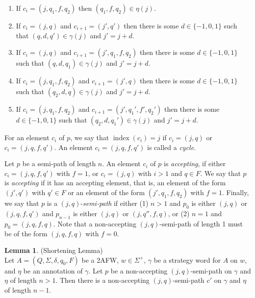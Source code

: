 \documentclass{lmcs}
\theoremstyle{definition}
\newtheorem{lemma}[thm]{Lemma}
\DeclareMathOperator{\?}{?}
\DeclareMathOperator{\myindex}{index}
\begin{document}
\begin{enumerate}
    \item If $c_i = (j,q_1,f,q_2)$ then $(q_1,f,q_2) \in \eta(j)$.


    \item If $c_i = (j,q)$ and $c_{i+1} = (j',q')$ then there is some $d \in \{-1,0,1\}$ such that $(q,d,q') \in \gamma(j)$ and $j' = j + d$.


    \item If $c_i = (j,q)$ and $c_{i+1} = (j',q_1,f,q_2)$ then there is some $d \in \{-1,0,1\}$ such that $(q,d,q_1) \in \gamma(j)$ and $j' = j+d$.


    \item If $c_i = (j,q_1,f,q_2)$ and $c_{i+1} = (j',q)$ then there is some $d \in \{-1,0,1\}$ such that $(q_2,d,q) \in \gamma(j)$ and $j' = j + d$.


    \item If $c_i = (j,q_1,f,q_2)$ and $c_{i+1} = (j',q_1',f',q_2')$ then there is some $d \in \{-1,0,1\}$ such that $(q_2,d,q_1') \in \gamma(j)$ and $j' = j + d$.

\end{enumerate}
For an element $c_i$ of $p$, we say that $\myindex(c_i)=j$ if $c_i=(j,q)$ or $c_i=(j,q,f,q')$. An element $c_i=(j,q,f,q')$ is called a \emph{cycle}.

Let $p$ be a semi-path of length $n$. An element $c_i$ of $p$ is \emph{accepting}, if either $c_i=(j,q,f,q')$ with $f=1$, or $c_i=(j,q)$ with $i>1$ and $q\in F$.
We say that $p$ is \emph{accepting} if it has an accepting element, that is, an element of the form $(j',q')$ with $q' \in F$ or an element of the form $(j',q_1,f,q_2)$ with $f = 1$. Finally, we say that $p$ is a $(j,q)$-\textit{semi-path} if either (1) $n>1$ and $p_0$ is either $(j,q)$ or $(j,q,f,q')$ and $p_{n-1}$ is either $(j,q)$ or $(j,q'',f,q)$, or (2) $n=1$ and $p_0 = (j,q,f,q)$. Note that a non-accepting $(j,q)$-semi-path of length 1 must be of the form $(j,q,f,q)$ with $f=0$.

\begin{lemma} (Shortening Lemma)\\
Let $A = (Q,\Sigma,\delta,q_0,F)$ be a 2AFW, $w \in \Sigma^+$, $\gamma$ be a strategy word for $A$ on $w$, and $\eta$ be an annotation of $\gamma$. Let $p$ be a  non-accepting $(j,q)$-semi-path on $\gamma$ and $\eta$ of length $n>1$. Then there is a non-accepting $(j,q)$-semi-path $c'$ on $\gamma$ and $\eta$ of length $n-1$.
\end{lemma}
\end{document}
